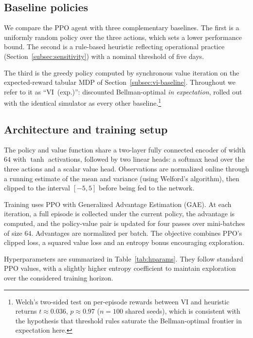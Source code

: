 \subsection{Baseline policies}
\label{subsec:baselines}

We compare the PPO agent with three complementary baselines.
The first is a uniformly random policy over the three actions,
which sets a lower performance bound. The second is a rule-based heuristic
reflecting operational practice (Section~\ref{subsec:sensitivity})
with a nominal threshold of five days.

The third is the greedy policy computed by synchronous value iteration on
the expected-reward tabular MDP of Section~\ref{subsec:vi-baseline}.
Throughout we refer to it as ``VI~(exp.)'': discounted Bellman-optimal
\emph{in expectation}, rolled out with the identical simulator as every other
baseline.\footnote{Welch's two-sided test on per-episode rewards between
VI and heuristic returns $t \approx 0.036$, $p \approx 0.97$ ($n{=}100$ shared seeds),
which is consistent with the hypothesis that threshold rules saturate the Bellman-optimal frontier in expectation here.}


\subsection{Architecture and training setup}
\label{subsec:training}

The policy and value function share a two-layer fully connected encoder
of width $64$ with $\tanh$ activations, followed by two linear heads: a
softmax head over the three actions and a scalar value head.
Observations are normalized online through a running estimate of the
mean and variance (using Welford's algorithm), then clipped to the
interval $[-5, 5]$ before being fed to the network.

Training uses PPO with Generalized Advantage Estimation (GAE). At each
iteration, a full episode is collected under the current policy, the
advantage is computed, and the policy-value pair is updated for four
passes over mini-batches of size $64$. Advantages are normalized per
batch. The objective combines PPO's clipped loss, a squared value loss
and an entropy bonus encouraging exploration.

Hyperparameters are summarized in Table~\ref{tab:hparams}. They follow
standard PPO values, with a slightly higher entropy coefficient to
maintain exploration over the considered training horizon.

